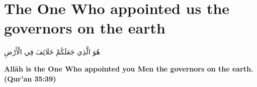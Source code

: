 \chapter{The One Who appointed us the governors on the earth}
\begin{center}
    {\Huge    
        \begin{Arabic}
            هُوَ الَّذِي جَعَلَكُمْ خَلَائِفَ فِي الْأَرْضِ
        \end{Arabic}
    }
\end{center}
\vspace*{\fill}
\vspace{3cm}
\begin{center}
    \large \textbf{Allāh is the One Who appointed you Men the governors on the earth. (Qur'an 35:39)}
\end{center}
